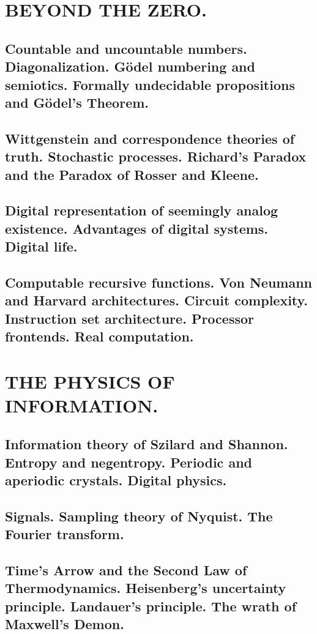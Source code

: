 \documentclass[letterpaper,draft]{memoir}
\begin{document}
\part{BEYOND THE ZERO.}

\chapter{Countable and uncountable numbers. Diagonalization. Gödel numbering and
semiotics. Formally undecidable propositions and Gödel's Theorem.}

\chapter{Wittgenstein and correspondence theories of truth. Stochastic processes.
Richard's Paradox and the Paradox of Rosser and Kleene.}

\chapter{Digital representation of seemingly analog existence. Advantages of digital
systems. Digital life.}

\chapter{Computable recursive functions. Von Neumann and Harvard architectures.
Circuit complexity. Instruction set architecture. Processor frontends. Real computation.}

\part{THE PHYSICS OF INFORMATION.}

\chapter{Information theory of Szilard and Shannon. Entropy and negentropy. Periodic
and aperiodic crystals. Digital physics.}

\chapter{Signals. Sampling theory of Nyquist. The Fourier transform.}

\chapter{Time's Arrow and the Second Law of Thermodynamics. Heisenberg's uncertainty
principle. Landauer's principle. The wrath of Maxwell's Demon.}
\end{document}
